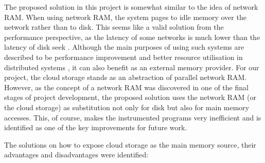 \documentclass[bsc,frontabs,twoside,singlespacing,parskip,deptreport]{infthesis}     %
\begin{document}
The proposed solution in this project is somewhat similar to the idea of network RAM. When using network RAM, the system pages to idle memory over the network rather than to disk. This seems like a valid solution from the performance perspective, as the latency of some networks is much lower than the latency of disk seek \citep{numbers_should_know}. Although the main purposes of using such systems are described to be performance improvement \citep{Anderson:1998:ENR:893677} and better resource utilisation in distributed systems \citep{1327942}, it can also benefit as an external memory provider. For our project, the cloud storage stands as an abstraction of parallel network RAM. However, as the concept of a network RAM was discovered in one of the final stages of project development, the proposed solution uses the network RAM (or the cloud storage) as substitution not only for disk but also for main memory accesses. This, of course, makes the instrumented programs very inefficient and is identified as one of the key improvements for future work.

The solutions on how to expose cloud storage as the main memory source, their advantages and disadvantages were identified:
\end{document}
